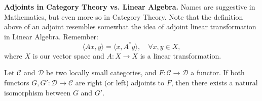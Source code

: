 \begin{shaded}
  \textbf{Adjoints in Category Theory vs. Linear Algebra.} Names are suggestive in Mathematics,
  but even more so in Category Theory. Note that the definition above of an adjoint resembles
  somewhat the idea of adjoint linear transformation in Linear Algebra. Remember:
  \begin{displaymath}
    \langle A x, y \rangle  = \langle x, A^* y \rangle, \quad \forall x,y \in X,
  \end{displaymath}
  where $X$ is our vector space and $A: X \to X$ is a linear transformation.
\end{shaded}

\begin{proposition}
  Let $\mathcal C$ and $\mathcal D$ be two locally small categories, and $F:\mathcal C \to \mathcal D$
  a functor. If both functors $G,G':\mathcal D \to \mathcal C$ are right (or left) adjoints
  to $F$, then there exists a natural isomorphism between $G$ and $G'$.
\end{proposition}
